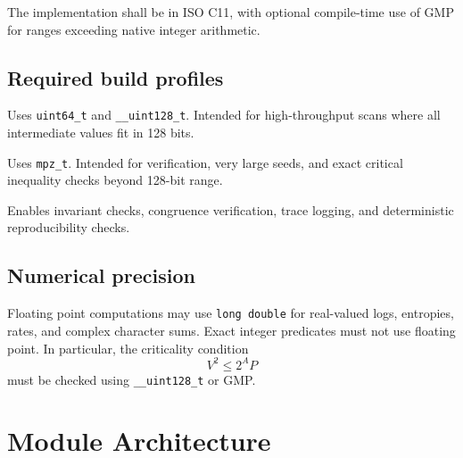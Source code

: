 \documentclass[11pt]{article}
\begin{document}
The implementation shall be in ISO C11, with optional compile-time use of GMP for ranges exceeding native integer arithmetic.

\subsection{Required build profiles}

\begin{description}[leftmargin=2.7cm]
\item[\texttt{FAST128}] Uses \texttt{uint64\_t} and \texttt{\_\_uint128\_t}.  Intended for high-throughput scans where all intermediate values fit in 128 bits.
\item[\texttt{GMP}] Uses \texttt{mpz\_t}.  Intended for verification, very large seeds, and exact critical inequality checks beyond 128-bit range.
\item[\texttt{DEBUG}] Enables invariant checks, congruence verification, trace logging, and deterministic reproducibility checks.
\end{description}

\subsection{Numerical precision}

Floating point computations may use \texttt{long double} for real-valued logs, entropies, rates, and complex character sums.  Exact integer predicates must not use floating point.  In particular, the criticality condition
\[
        V^2\le 2^A P
\]
must be checked using \texttt{\_\_uint128\_t} or GMP.

\section{Module Architecture}
\end{document}
